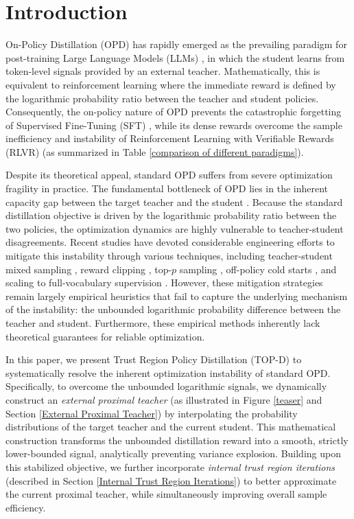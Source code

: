 \documentclass{article}
\theoremstyle{plain}
\theoremstyle{definition}
\theoremstyle{remark}
\begin{document}
\section{Introduction}
On-Policy Distillation (OPD) \citep{lu2025onpolicydistillation} has rapidly emerged as the prevailing paradigm for post-training Large Language Models (LLMs) \citep{yang2025qwen3, xiao2026mimo, zeng2026glm, yang2026nemotron, deepseekai2026deepseekv4}, in which the student learns from token-level signals provided by an external teacher. Mathematically, this is equivalent to reinforcement learning where the immediate reward is defined by the logarithmic probability ratio between the teacher and student policies. Consequently, the on-policy nature of OPD prevents the catastrophic forgetting of Supervised Fine-Tuning (SFT) \citep{shenfeld2026self}, while its dense rewards overcome the sample inefficiency and instability of Reinforcement Learning with Verifiable Rewards (RLVR) (as summarized in Table \ref{comparison of different paradigms}).

Despite its theoretical appeal, standard OPD suffers from severe optimization fragility in practice. The fundamental bottleneck of OPD lies in the inherent capacity gap between the target teacher and the student \citep{jang2026stable}. Because the standard distillation objective is driven by the logarithmic probability ratio between the two policies, the optimization dynamics are highly vulnerable to teacher-student disagreements. Recent studies have devoted considerable engineering efforts to mitigate this instability through various techniques, including teacher-student mixed sampling \citep{gu2024minillm}, reward clipping \citep{ko2026scaling}, top-$p$ sampling \citep{fu2026revisiting}, off-policy cold starts \citep{li2026rethinking}, and scaling to full-vocabulary supervision \citep{deepseekai2026deepseekv4}. However, these mitigation strategies remain largely empirical heuristics that fail to capture the underlying mechanism of the instability: the unbounded logarithmic probability difference between the teacher and student. Furthermore, these empirical methods inherently lack theoretical guarantees for reliable optimization.

In this paper, we present Trust Region Policy Distillation (TOP-D) to systematically resolve the inherent optimization instability of standard OPD. Specifically, to overcome the unbounded logarithmic signals, we dynamically construct an \textit{external proximal teacher} (as illustrated in Figure \ref{teaser} and Section \ref{External Proximal Teacher}) by interpolating the probability distributions of the target teacher and the current student. This mathematical construction transforms the unbounded distillation reward into a smooth, strictly lower-bounded signal, analytically preventing variance explosion. Building upon this stabilized objective, we further incorporate \textit{internal trust region iterations} (described in Section \ref{Internal Trust Region Iterations}) to better approximate the current proximal teacher, while simultaneously improving overall sample efficiency.
\end{document}

